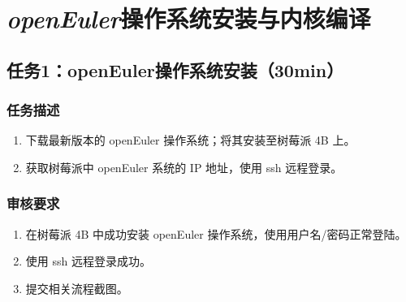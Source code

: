 \documentclass{article}
\begin{document}
\section{\textit{openEuler}操作系统安装与内核编译}

\subsection{任务1：openEuler操作系统安装（30min）}
\subsubsection{任务描述}
\begin{enumerate}
	\item 下载最新版本的 openEuler 操作系统；将其安装至树莓派 4B 上。
	\item 获取树莓派中 openEuler 系统的 IP 地址，使用 ssh 远程登录。
\end{enumerate}

\subsubsection{审核要求}
\begin{enumerate}
	\item 在树莓派 4B 中成功安装 openEuler 操作系统，使用用户名/密码正常登陆。
	\item 使用 ssh 远程登录成功。
	\item 提交相关流程截图。
\end{enumerate}
\end{document}
